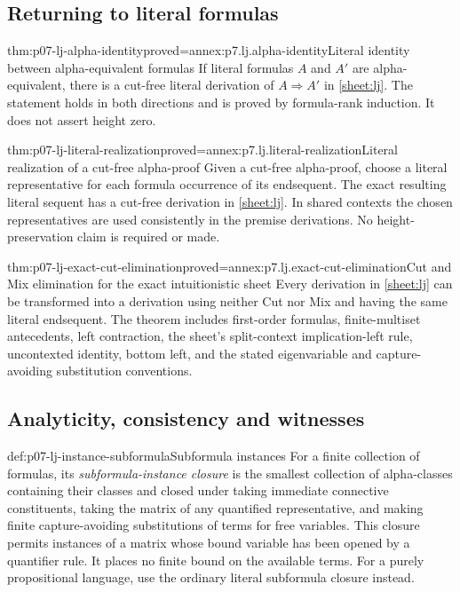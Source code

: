 \subsection{Returning to literal formulas}
\label{sec:p07-lj-literal-realization}

\begin{hblemma}{thm:p07-lj-alpha-identity}{proved=annex:p7.lj.alpha-identity}{Literal identity between alpha-equivalent formulas}
If literal formulas \(A\) and \(A'\) are alpha-equivalent, there is a
cut-free literal derivation of \(A\Rightarrow A'\) in \ref{sheet:lj}.
The statement holds in both directions and is proved by formula-rank
induction.  It does not assert height zero.
\end{hblemma}

\begin{hblemma}{thm:p07-lj-literal-realization}{proved=annex:p7.lj.literal-realization}{Literal realization of a cut-free alpha-proof}
Given a cut-free alpha-proof, choose a literal representative for each
formula occurrence of its endsequent.  The exact resulting literal
sequent has a cut-free derivation in \ref{sheet:lj}.  In shared contexts
the chosen representatives are used consistently in the premise
derivations.  No height-preservation claim is required or made.
\end{hblemma}

\begin{hbtheorem}{thm:p07-lj-exact-cut-elimination}{proved=annex:p7.lj.exact-cut-elimination}{Cut and Mix elimination for the exact intuitionistic sheet}
Every derivation in \ref{sheet:lj} can be transformed into a derivation
using neither Cut nor Mix and having the same literal endsequent.
The theorem includes first-order formulas, finite-multiset antecedents,
left contraction, the sheet's split-context implication-left rule,
uncontexted identity, bottom left, and the stated eigenvariable and
capture-avoiding substitution conventions.
\end{hbtheorem}

\subsection{Analyticity, consistency and witnesses}
\label{sec:p07-lj-cut-consequences}

\begin{hbdefinition}{def:p07-lj-instance-subformula}{Subformula instances}
For a finite collection of formulas, its \emph{subformula-instance
closure} is the smallest collection of alpha-classes containing their
classes and closed under taking immediate connective constituents,
taking the matrix of any quantified representative, and making finite capture-avoiding
substitutions of terms for free variables.  This closure permits
instances of a matrix whose bound variable has been opened by a
quantifier rule.  It places no finite bound on the available terms.
For a purely propositional language, use the ordinary literal subformula
closure instead.
\end{hbdefinition}

